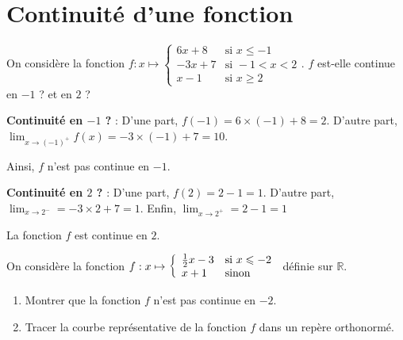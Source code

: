 \documentclass[11pt,fleqn, openany]{book} %
\begin{document}
\section*{Continuité d'une fonction}

\begin{exercise} On considère la fonction \renewcommand{\arraystretch}{1}$f:x\mapsto \left\{ \begin{array}{ll}
6x+8 & \text{si }x\leqslant -1\\
-3x+7 & \text{si }-1< x < 2\\
x-1 & \text{si } x \geqslant 2
\end{array}\right. .$  $f$ est-elle continue en $-1$ ? et en $2$ ?
\end{exercise}

\begin{solution}

\textbf{Continuité en $-1$ ?} :  D'une part, $f(-1)=6\times (-1)+8=2$. D'autre part, $\displaystyle \lim_{x \to (-1)^+} f(x)= -3 \times (-1) +7=10$.

Ainsi, $f$ n'est pas continue en $-1$.

\textbf{Continuité en $2$ ?} : D'une part, $f(2)=2-1=1$. D'autre part, $\displaystyle \lim _{x \to 2^-}=-3\times 2 + 7 = 1$. Enfin, $\displaystyle \lim _{x \to 2^+}=2-1= 1$

La fonction $f$ est continue en $2$.\end{solution}



\begin{exercise}On considère la fonction $f:x\mapsto \left\{ \renewcommand{\arraystretch}{1} \begin{array}{ll}
\frac{1}{2}x -3 & \text{si }x\leqslant -2\\
x+1 & \text{sinon }
\end{array}\right.$ définie sur $\mathbb{R}$.
\vskip10pt
\begin{enumerate}
\item Montrer que la fonction $f$ n'est pas continue en $-2$.
\item Tracer la courbe représentative de la fonction $f$ dans un repère orthonormé.
\end{enumerate}\end{exercise}
\end{document}
